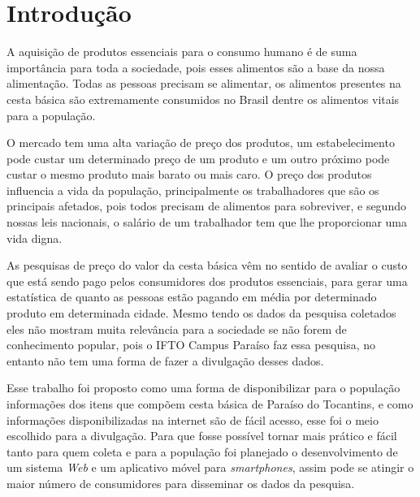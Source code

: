 \documentclass{ifto-tex}
\begin{document}
\tableofcontents*
\cleardoublepage


\textual

\chapter{Introdução}
A aquisição de produtos essenciais para o consumo humano é de suma importância para toda a sociedade, pois esses alimentos são a base da nossa alimentação. Todas as pessoas precisam se alimentar, os alimentos presentes na cesta básica são extremamente consumidos no Brasil dentre os alimentos vitais para a população.

O mercado tem uma alta variação de preço dos produtos, um estabelecimento pode custar um determinado preço de um produto e um outro próximo pode custar o mesmo produto mais barato ou mais caro. O preço dos produtos influencia a vida da população, principalmente os trabalhadores que são os principais afetados, pois todos precisam de alimentos para sobreviver, e segundo nossas leis nacionais, o salário de um trabalhador tem que lhe proporcionar uma vida digna.

As pesquisas de preço do valor da cesta básica vêm no sentido de avaliar o custo que está sendo pago pelos consumidores dos produtos essenciais, para gerar uma estatística de quanto as pessoas estão pagando em média por determinado produto em determinada cidade. Mesmo tendo os dados da pesquisa coletados eles não mostram muita relevância para a sociedade se não forem de conhecimento popular, pois o IFTO Campus Paraíso faz essa pesquisa, no entanto não tem uma forma de fazer a divulgação desses dados.

Esse trabalho foi proposto como uma forma de disponibilizar para o população informações dos itens que compõem cesta básica de Paraíso do Tocantins, e como informações disponibilizadas na internet são de fácil acesso, esse foi o meio escolhido para a divulgação. Para que fosse possível tornar mais prático e fácil tanto para quem coleta e para a população foi planejado o desenvolvimento de um sistema \textit{Web} e um aplicativo móvel para \textit{smartphones}, assim pode se atingir o maior número de consumidores para disseminar os dados da pesquisa.
\end{document}
